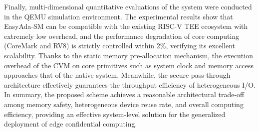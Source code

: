 \documentclass[master, vlined, review]{DissertUESTC}
\begin{document}
	Finally, multi-dimensional quantitative evaluations of the system were conducted in the QEMU simulation environment. The experimental results show that EasyAda-SM can be compatible with the existing RISC-V TEE ecosystem with extremely low overhead, and the performance degradation of core computing (CoreMark and RV8) is strictly controlled within 2\%, verifying its excellent scalability. Thanks to the static memory pre-allocation mechanism, the execution overhead of the CVM on core primitives such as system clock and memory access approaches that of the native system. Meanwhile, the secure pass-through architecture effectively guarantees the throughput efficiency of heterogeneous I/O. In summary, the proposed scheme achieves a reasonable architectural trade-off among memory safety, heterogeneous device reuse rate, and overall computing efficiency, providing an effective system-level solution for the generalized deployment of edge confidential computing.
	
	
	
	\tableofcontents  %
	
	\listoffigures  %
	
	
	
	
	
	
	
	
\end{document}
